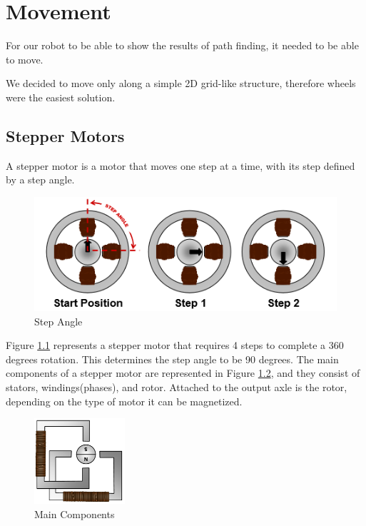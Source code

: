 \chapter{Movement}\label{ch:move}
For our robot to be able to show the results of path finding,
it needed to be able to move.

We decided to move only along a simple 2D grid-like structure,
therefore wheels were the easiest solution.

\section{Stepper Motors}\label{sec:motors}
A stepper motor is a motor that moves one step at a time, with its step defined by a step angle.

\begin{figure}[ht]
	\centering
	\includegraphics[width=\textwidth]{figures/move/motor1.png}
	\caption{Step Angle}
	\label{fig:angle} 
\end{figure}

Figure \ref{fig:angle} represents a stepper motor that requires 4 steps to complete a 360 degrees rotation. This determines the step angle to be 90 degrees.
The main components of a stepper motor are represented in Figure \ref{fig:main_components}, and they consist of stators, windings(phases), and rotor.
Attached to the output axle is the rotor, depending on the type of motor it can be magnetized.

\begin{figure}[ht]
	\centering
	\includegraphics[width=0.3\textwidth]{figures/move/motor2.png}
	\caption{Main Components}
	\label{fig:main_components}
\end{figure}

